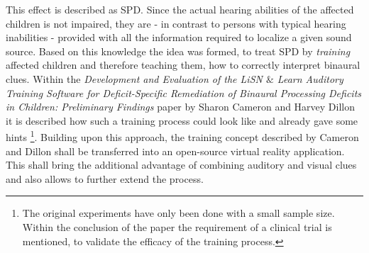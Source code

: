 \documentclass[a4paper,11pt]{article}%
\renewcommand{\\}{\vspace*{0.5\baselineskip} \newline}
\begin{document}
\newline
\newline
This effect is described as \ac{SPD}. Since the actual hearing abilities of the affected children is not impaired, they are - in contrast to persons with typical hearing inabilities - provided with all the information required to localize a given sound source. Based on this knowledge the idea was formed, to treat \ac{SPD} by \textit{training} affected children and therefore teaching them, how to correctly interpret binaural clues.
\newline
\newline
Within the \textit{Development and Evaluation of the \ac{LiSN} $\&$ Learn Auditory Training Software for Deficit-Specific Remediation of Binaural Processing Deficits in Children: Preliminary Findings} \cite{LiSN-A} paper by Sharon Cameron and Harvey Dillon it is described how such a training process could look like and already gave some hints \footnote{The original experiments have only been done with a small sample size. Within the conclusion of the paper the requirement of a clinical trial is mentioned, to validate the efficacy of the training process.}.
\newline
\newline
Building upon this approach, the training concept described by Cameron and Dillon shall be transferred into an open-source virtual reality application. This shall bring the additional advantage of combining auditory and visual clues and also allows to further extend the process. 







\end{document}
